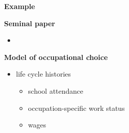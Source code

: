 \begin{frame}\begin{center}
\LARGE\textbf{Example}
\end{center}\end{frame}
\begin{frame}\textbf{Seminal paper}\vspace{0.3cm}
\begin{itemize}
\item {}
\end{itemize}
\end{frame}
\begin{frame}\textbf{Model of occupational choice}\vspace{0.3cm}

\begin{itemize}\setlength\itemsep{1em}
\item life cycle histories \medskip
\begin{itemize}\setlength\itemsep{1em}
\item school attendance
\item occupation-specific work status
\item wages
\end{itemize}
\end{itemize}
\end{frame}

